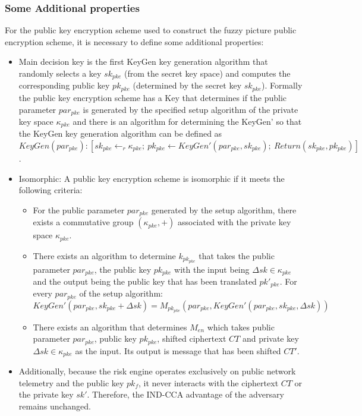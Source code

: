 \documentclass[pdflatex,sn-mathphys-num]{sn-jnl}
\theoremstyle{thmstyleone}%
\theoremstyle{thmstyletwo}%
\theoremstyle{thmstylethree}%
\begin{document}
\subsubsection{Some Additional properties}\label{sec6}
For the public key encryption scheme used to construct the fuzzy picture public encryption scheme, it is necessary to define some additional properties:

\begin{itemize}
	\item Main decision key is the first KeyGen key generation algorithm that randomly selects a key $sk_{pke}$ (from the secret key space) and computes the corresponding public key $pk_{pke}$ (determined by the secret key $sk_{pke}$). Formally the public key encryption scheme has a Key that determines if the public parameter $par_{pke}$ is generated by the specified setup algorithm of the private key space $\kappa_{pke}$ and there is an algorithm for determining the KeyGen' so that the KeyGen key generation algorithm can be defined as $KeyGen(par_{pke}): [sk_{pke} \leftarrow_r \kappa_{pke}; \ pk_{pke} \leftarrow KeyGen'(par_{pke}, sk_{pke}); \ Return(sk_{pke}, pk_{pke})]$.
	
	\item Isomorphic: A public key encryption scheme is isomorphic if it meets the following criteria:
	\begin{itemize}
		\item[+] For the public parameter $par_{pke}$ generated by the setup algorithm, there exists a commutative group $(\kappa_{pke}, +)$ associated with the private key space $\kappa_{pke}$.
		
		\item[+] There exists an algorithm to determine $k_{pk_{pke}}$ that takes the public parameter $par_{pke}$, the public key $pk_{pke}$ with the input being $\Delta sk \in \kappa_{pke}$ and the output being the public key that has been translated $pk'_{pke}$. For every $par_{pke}$ of the setup algorithm:
		\[
		KeyGen'(par_{pke}, sk_{pke} + \Delta sk) = M_{pk_{pke}}(par_{pke}, KeyGen'(par_{pke}, sk_{pke}, \Delta sk))
		\]
		
		\item[+] There exists an algorithm that determines $M_{en}$ which takes public parameter $par_{pke}$, public key $pk_{pke}$, shifted ciphertext $CT$ and private key $\Delta sk \in \kappa_{pke}$ as the input. Its output is message that has been shifted $CT'$.
	\end{itemize}
	
	\item Additionally, because the risk engine operates exclusively on public network telemetry and the public key $pk_f$, it never interacts with the ciphertext $CT$ or the private key $sk'$. Therefore, the IND-CCA advantage of the adversary remains unchanged.
\end{itemize}
\end{document}
